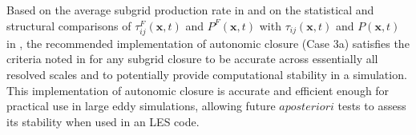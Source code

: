 Based on the average subgrid production rate in  and on the statistical and structural comparisons of  $\tau_{ij}^{F}(\mathbf{x},t)$ and $P^{F}(\mathbf{x},t)$  with  $\tau_{ij}(\mathbf{x},t)$ and  $P(\mathbf{x},t)$ in , the recommended implementation of autonomic closure (Case 3a) satisfies the criteria noted in  for any subgrid closure to be accurate across essentially all resolved scales and to potentially provide computational stability in a simulation. This implementation of autonomic closure is accurate and efficient enough for practical use in large eddy simulations, allowing future $a posteriori$ tests to assess its stability when used in an LES code.





% 

